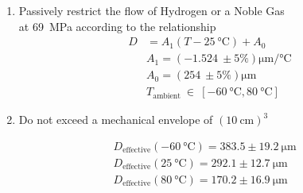 \documentclass[12pt, letterpaper]{report}%
\newcommand{\Dcold}{D_{\text{effective}}(\SI{-60}{\celsius}) = 383.5 \pm \SI{19.2}{\micro\meter}}
\newcommand{\Dhot}{D_{\text{effective}}(\SI{80}{\celsius}) = 170.2 \pm \SI{16.9}{\micro\meter}}
\newcommand{\Dref}{D_{\text{effective}}(\SI{25}{\celsius}) = 292.1 \pm \SI{12.7}{\micro\meter}}
\newcommand{\Thot}{\SI{80}{\degreeCelsius}} %
\newcommand{\Tcold}{\SI{-60}{\degreeCelsius}} %
\begin{document}
\color{ucdgold}

\begin{enumerate}
	\item Passively restrict the flow of Hydrogen or a Noble Gas\\at \SI{69}{\mega\pascal} according to the relationship \\
		\begin{align*}
			D &= A_1 (T - \SI{25}{\degreeCelsius}) + A_0 \\[12pt]
			&A_1 = \left( \SI{-1.524}{} \pm5\% \right) \si{\micro\meter\per\degreeCelsius} \\[6pt]
			&A_0 = \left(\SI{254}{} \pm 5\% \right) \si{\micro\meter} \\[6pt]
			&T_{\text{ambient}}\ \in\ [\Tcold,\Thot]
		\end{align*}
  \item Do not exceed a mechanical envelope of $\left( \SI{10}{\centi\meter} \right)^3$
\end{enumerate}

\begin{align*}
	&\Dcold \\
	&\Dref \\
	&\Dhot
\end{align*}
\end{document}
